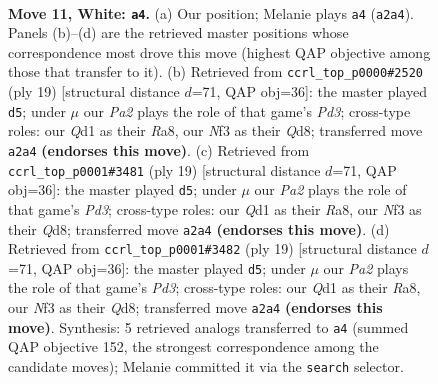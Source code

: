 \documentclass[11pt]{article}
\begin{document}
\clearpage

\begin{figure}[p]\centering
\begin{subfigure}{0.46\textwidth}\centering
\resizebox{\linewidth}{!}{%
\newchessgame
\chessboard[
  setfen={r1b1k2r/p1p1qpp1/2n2n2/1p1p3p/3P4/2B2NP1/PP2PPBP/R2Q1RK1 w kq - 0 11},
  showmover=false,
  pgfstyle=straightmove, color=movearrow, markmove={a2-a4}
]}
\caption{}
\end{subfigure}\hfill
\begin{subfigure}{0.46\textwidth}\centering
\resizebox{\linewidth}{!}{%
\newchessgame
\chessboard[
  setfen={r2qkb1r/1p3ppp/p1np1n2/4p3/P3P3/N1N5/1PP1QPPP/R1B1K2R b KQkq - 0 10},
  showmover=false,
  pgfstyle=straightmove, color=movearrow, markmove={d6-d5}
]}
\caption{}
\end{subfigure}
\\[4pt]
\begin{subfigure}{0.46\textwidth}\centering
\resizebox{\linewidth}{!}{%
\newchessgame
\chessboard[
  setfen={r2qkb1r/1p3ppp/p1np1n2/4p3/P3P3/N1N5/1PP1QPPP/R1B1K2R b KQkq - 0 10},
  showmover=false,
  pgfstyle=straightmove, color=movearrow, markmove={d6-d5}
]}
\caption{}
\end{subfigure}\hfill
\begin{subfigure}{0.46\textwidth}\centering
\resizebox{\linewidth}{!}{%
\newchessgame
\chessboard[
  setfen={r2qkb1r/1p3ppp/p1np1n2/4p3/P3P3/N1N5/1PP1QPPP/R1B1K2R b KQkq - 0 10},
  showmover=false,
  pgfstyle=straightmove, color=movearrow, markmove={d6-d5}
]}
\caption{}
\end{subfigure}
\caption{\textbf{Move 11, White: \texttt{a4}.} (a) Our position; Melanie plays \texttt{a4} (\texttt{a2a4}). Panels (b)--(d) are the retrieved master positions whose correspondence most drove this move (highest QAP objective among those that transfer to it). (b) Retrieved from \texttt{ccrl\_top\_p0000\#2520} (ply 19) [structural distance $d$=71, QAP obj=36]: the master played \texttt{d5}; under $\mu$ our \emph{Pa2} plays the role of that game's \emph{Pd3}; cross-type roles: our \emph{Q}d1 as their \emph{R}a8, our \emph{N}f3 as their \emph{Q}d8; transferred move \texttt{a2a4} \textbf{(endorses this move)}. (c) Retrieved from \texttt{ccrl\_top\_p0001\#3481} (ply 19) [structural distance $d$=71, QAP obj=36]: the master played \texttt{d5}; under $\mu$ our \emph{Pa2} plays the role of that game's \emph{Pd3}; cross-type roles: our \emph{Q}d1 as their \emph{R}a8, our \emph{N}f3 as their \emph{Q}d8; transferred move \texttt{a2a4} \textbf{(endorses this move)}. (d) Retrieved from \texttt{ccrl\_top\_p0001\#3482} (ply 19) [structural distance $d$=71, QAP obj=36]: the master played \texttt{d5}; under $\mu$ our \emph{Pa2} plays the role of that game's \emph{Pd3}; cross-type roles: our \emph{Q}d1 as their \emph{R}a8, our \emph{N}f3 as their \emph{Q}d8; transferred move \texttt{a2a4} \textbf{(endorses this move)}. Synthesis: 5 retrieved analogs transferred to \texttt{a4} (summed QAP objective 152, the strongest correspondence among the candidate moves); Melanie committed it via the \texttt{search} selector.}
\label{fig:thought-m20}
\end{figure}
\end{document}
